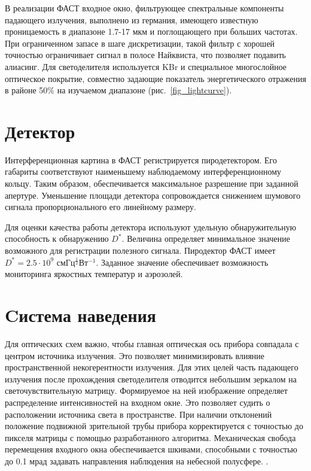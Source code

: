 \documentclass{mipt-thesis-bs}
\begin{document}
	В реализации ФАСТ входное окно, фильтрующее спектральные компоненты падающего излучения, выполнено из германия, имеющего известную проницаемость в диапазоне 1.7-17 мкм и поглощающего при больших частотах. При ограниченном запасе в шаге дискретизации, такой фильтр с хорошей точностью ограничивает сигнал в полосе Найквиста, что позволяет подавить алиасинг.  Для светоделителя используется KBr и специальное многослойное оптическое покрытие, совместно задающие показатель энергетического отражения в районе 50\% на изучаемом диапазоне (рис.~\ref{fig_lightcurve}). 
	
	\section{Детектор}
	
  Интерференционная картина в ФАСТ регистрируется пиродетектором. Его габариты соответствуют наименьшему наблюдаемому интерференционному кольцу. Таким образом, обеспечивается максимальное разрешение при заданной апертуре. Уменьшение площади детектора сопровождается снижением шумового сигнала пропорционального его линейному размеру.
  
   Для оценки качества работы детектора используют удельную обнаружительную способность к обнаружению $D^*$. Величина определяет минимальное значение возможного для регистрации полезного сигнала.  Пиродектор ФАСТ имеет $D^*=2.5 \cdot 10^{9}$ $см Гц^{\frac{1}{2}} Вт^{-1}$. Заданное значение обеспечивает возможность мониторинга яркостных температур и аэрозолей.
	
	\section{Cистема наведения}
	
	Для оптических схем важно, чтобы главная оптическая ось прибора совпадала с центром источника излучения. Это позволяет минимизировать влияние пространственной некогерентности излучения. Для этих целей часть падающего излучения после прохождения светоделителя  отводится небольшим зеркалом на светочувствительную матрицу. Формируемое на ней изображение определяет распределение интенсивностей на входном окне. Это позволяет судить о расположении источника света в пространстве. При наличии отклонений положение подвижной зрительной трубы прибора корректируется с точностью до пикселя матрицы с помощью разработанного алгоритма. Механическая свобода перемещения входного окна обеспечивается шкивами, способными с точностью до 0.1 мрад задавать направления наблюдения на небесной полусфере.  \cite{shakun2019two}.
	
\end{document}
